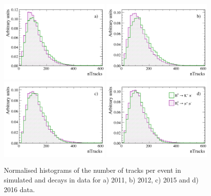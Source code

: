 \begin{figure}[tbp]
  \centering
    \includegraphics[width=0.49\textwidth]{./Figs/LifetimeMeasurement/nTracks_2011_Bs2MuMu_Bd2KPi.pdf}
    \includegraphics[width=0.49\textwidth]{./Figs/LifetimeMeasurement/nTracks_2012_Bs2MuMu_Bd2KPi.pdf}
    \includegraphics[width=0.49\textwidth]{./Figs/LifetimeMeasurement/nTracks_2015_Bs2MuMu_Bd2KPi.pdf}
    \includegraphics[width=0.49\textwidth]{./Figs/LifetimeMeasurement/nTracks_2016_Bs2MuMu_Bd2KPi.pdf}
  \caption{Normalised histograms of the number of tracks per event in simulated \bdkpi and \bsmumu decays in data for a) 2011, b) 2012, c) 2015 and d) 2016 data.}%
  \label{fig:BsmmVsBdToKpinTracks}
\end{figure}

